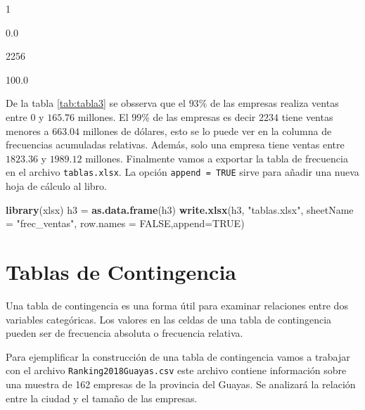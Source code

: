 \documentclass[]{book}
\newenvironment{Shaded}{\begin{snugshade}}{\end{snugshade}}
\newcommand{\KeywordTok}[1]{\textcolor[rgb]{0.13,0.29,0.53}{\textbf{#1}}}
\newcommand{\DataTypeTok}[1]{\textcolor[rgb]{0.13,0.29,0.53}{#1}}
\newcommand{\DecValTok}[1]{\textcolor[rgb]{0.00,0.00,0.81}{#1}}
\newcommand{\StringTok}[1]{\textcolor[rgb]{0.31,0.60,0.02}{#1}}
\newcommand{\OtherTok}[1]{\textcolor[rgb]{0.56,0.35,0.01}{#1}}
\newcommand{\OperatorTok}[1]{\textcolor[rgb]{0.81,0.36,0.00}{\textbf{#1}}}
\newcommand{\NormalTok}[1]{#1}
\begin{document}
1

0.0

2256

100.0

De la tabla \ref{tab:tabla3} se obsserva que el \(93\%\) de las empresas
realiza ventas entre 0 y \(165.76\) millones. El \(99\%\) de las
empresas es decir \(2234\) tiene ventas menores a \(663.04\) millones de
dólares, esto se lo puede ver en la columna de frecuencias acumuladas
relativas. Además, solo una empresa tiene ventas entre \(1823.36\) y
\(1989.12\) millones. Finalmente vamos a exportar la tabla de frecuencia
en el archivo \texttt{tablas.xlsx}. La opción \texttt{append\ =\ TRUE}
sirve para añadir una nueva hoja de cálculo al libro.

\begin{Shaded}
\begin{Highlighting}[]
\KeywordTok{library}\NormalTok{(xlsx)}
\NormalTok{h3 =}\StringTok{ }\KeywordTok{as.data.frame}\NormalTok{(h3)}
\KeywordTok{write.xlsx}\NormalTok{(h3, }\StringTok{"tablas.xlsx"}\NormalTok{, }\DataTypeTok{sheetName =} \StringTok{"frec_ventas"}\NormalTok{, }\DataTypeTok{row.names =} \OtherTok{FALSE}\NormalTok{,}\DataTypeTok{append=}\OtherTok{TRUE}\NormalTok{)}
\end{Highlighting}
\end{Shaded}

\section{Tablas de Contingencia}\label{tablas-de-contingencia}

Una tabla de contingencia es una forma útil para examinar relaciones
entre dos variables categóricas. Los valores en las celdas de una tabla
de contingencia pueden ser de frecuencia absoluta o frecuencia relativa.

Para ejemplificar la construcción de una tabla de contingencia vamos a
trabajar con el archivo \texttt{Ranking2018Guayas.csv} este archivo
contiene información sobre una muestra de 162 empresas de la provincia
del Guayas. Se analizará la relación entre la ciudad y el tamaño de las
empresas.

\begin{Shaded}
\end{Shaded}
\end{document}
